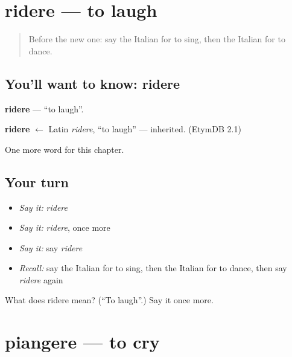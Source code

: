 \section[ridere]{ridere — to laugh}

\label{lesson:IT-C47-ridere}



\begin{quote}
Before the new one: say the Italian for to sing, then the Italian for to dance.
\end{quote}

\subsection*{You'll want to know: ridere}
\textbf{ridere} — \textquotedblleft{}to laugh\textquotedblright{}.

\begin{cousinweb}
\textbf{ridere} $\leftarrow$ Latin \emph{ridere}, \textquotedblleft{}to laugh\textquotedblright{} — inherited. (EtymDB 2.1)
\end{cousinweb}

\begin{grammarlens}[title={What you've built}]
One more word for this chapter.
\end{grammarlens}

\subsection*{Your turn}
\begin{itemize}
\raggedright
  \item \emph{Say it:} \emph{ridere}
  \item \emph{Say it:} \emph{ridere}, once more
  \item \emph{Say it:} say \emph{ridere}
  \item \emph{Recall:} say the Italian for to sing, then the Italian for to dance, then say \emph{ridere} again
\end{itemize}

\begin{tcolorbox}[breakable,colback=teal!4,colframe=teal!35!black,title={Before you move on}]
What does ridere mean? (\textquotedblleft{}To laugh\textquotedblright{}.) Say it once more.
\end{tcolorbox}
\section[piangere]{piangere — to cry}

